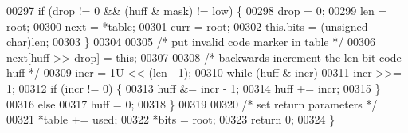 \begin{DoxyCode}
00297         \textcolor{keywordflow}{if} (drop != 0 && (huff & mask) != low) \{
00298             drop = 0;
00299             len = root;
00300             next = *table;
00301             curr = root;
00302             this.bits = (\textcolor{keywordtype}{unsigned} char)len;
00303         \}
00304 
00305         \textcolor{comment}{/* put invalid code marker in table */}
00306         next[huff >> drop] = \textcolor{keyword}{this};
00307 
00308         \textcolor{comment}{/* backwards increment the len-bit code huff */}
00309         incr = 1U << (len - 1);
00310         \textcolor{keywordflow}{while} (huff & incr)
00311             incr >>= 1;
00312         \textcolor{keywordflow}{if} (incr != 0) \{
00313             huff &= incr - 1;
00314             huff += incr;
00315         \}
00316         \textcolor{keywordflow}{else}
00317             huff = 0;
00318     \}
00319 
00320     \textcolor{comment}{/* set return parameters */}
00321     *table += used;
00322     *bits = root;
00323     \textcolor{keywordflow}{return} 0;
00324 \}
\end{DoxyCode}
